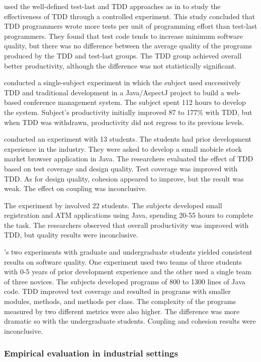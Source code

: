 \documentclass[smallextended]{svjour3}     %
\begin{document}
\cite{Erdogmus:05} used the well-defined test-last
and TDD approaches as in \cite{Matjaz:03} to study the effectiveness of TDD through a controlled experiment. 
This study
concluded that TDD programmers wrote more tests per unit of programming
effort than test-last programmers. They found that test code tends to increase 
minimum software quality, but there was no 
difference between the average quality of the programs produced by the TDD 
and test-last groups. The TDD group achieved overall better productivity, although 
the difference was not statistically significant.

\cite{Madeyski:07} conducted a single-subject experiment in which the subject used successively TDD and traditional 
development in a Java/AspectJ project to build a web-based conference management system.  The subject spent
112 hours to develop the system. Subject's productivity initially improved 87 to 177\% with TDD, but when TDD was 
withdrawn, productivity did not regress to its previous levels. 
 

\cite{Siniaalto:07} conducted an experiment with 13 students. The students 
had prior development experience in the industry. They were asked to develop a small mobicle stock market 
browser application in Java. The researchers evaluated the effect of TDD based on test coverage and design
quality. Test coverage was improved with TDD. As for design quality, cohesion appeared 
to improve, but the result was weak. The effect on coupling was inconclusive.

The experiment by \cite{Gupta:07} involved 22 students.
The subjects developed small registration and ATM applications using Java, spending 20-55 hours to complete
the task. The researchers observed that overall productivity was improved with TDD, but quality results 
were inconclusive.

\cite{Janzen:08}'s two experiments with graduate and undergraduate students yielded consistent results on software quality.
One experiment used two teams of three students with 0-5 years of prior development experience 
and the other used a single team of three novices. The subjects developed programs of 800 to 1300
lines of Java code. TDD improved test coverage and resulted in programs with smaller modules, methods, and methods per class. 
The 
complexity of the programs measured by two different metrics were also higher. The difference was  
 more dramatic so with the undergraduate students. Coupling
and cohesion results were inconclusive.


\subsubsection{Empirical evaluation in industrial settings}
\end{document}
